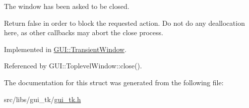The window has been asked to be closed. 

Return {\ttfamily false} in order to block the requested action. Do not do any deallocation here, as other callbacks may abort the close process. 

Implemented in \hyperlink{classGUI_1_1TransientWindow_afd212cef088556c0c11b89020bfa64dd}{G\-U\-I\-::\-Transient\-Window}.



Referenced by G\-U\-I\-::\-Toplevel\-Window\-::close().



The documentation for this struct was generated from the following file\-:\begin{DoxyCompactItemize}
\item 
src/libs/gui\-\_\-tk/\hyperlink{gui__tk_8h}{gui\-\_\-tk.\-h}\end{DoxyCompactItemize}
